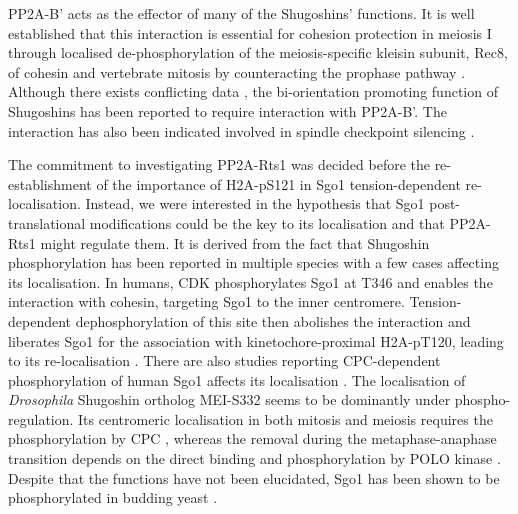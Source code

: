 PP2A-B' acts as the effector of many of the Shugoshins' functions. It is well established that this interaction is essential for cohesion protection in meiosis I through localised de-phosphorylation of the meiosis-specific kleisin subunit, Rec8, of cohesin \citep{Marston2004a, Kitajima2004a, Katis2004, Rabitsch2004TwoII, Rattani2013Sgol2Oocytes, Llano2008Shugoshin-2Mice, Lee2008} and vertebrate mitosis by counteracting the prophase pathway \citep{Shintomi2009ReleasingSgo1, Rivera2009ShugoshinExtracts, Orth2011ShugoshinMad2, Huang2007, Tang2006a, Tanno2010, McGuinness2005ShugoshinCells, Kitajima2005, Salic2004VertebrateMitosis}. Although there exists conflicting data \citep{Verzijlbergen2014, Eshleman2014}, the bi-orientation promoting function of Shugoshins has been reported to require interaction with PP2A-B'\citep{Peplowska2014, Rivera2012}. The interaction has also been indicated involved in spindle checkpoint silencing \citep{Rattani2013Sgol2Oocytes}. 

The commitment to investigating PP2A-Rts1 was decided before the re-establishment of the importance of H2A-pS121 in Sgo1 tension-dependent re-localisation. Instead, we were interested in the hypothesis that Sgo1 post-translational modifications could be the key to its localisation and that PP2A-Rts1 might regulate them. It is derived from the fact that Shugoshin phosphorylation has been reported in multiple species \citep{Llano2008Shugoshin-2Mice, Tanno2010, Rattani2013Sgol2Oocytes, Pouwels2007ShugoshinPlk1, Kawashima2007, Lee2014RegulationPhosphorylation, Liu2013, Liu2013a, Clarke2005, Resnick2006INCENPDrosophila, Nogueira2014, Yahya2020} with a few cases affecting its localisation. In humans, CDK phosphorylates Sgo1 at T346 and enables the interaction with cohesin, targeting Sgo1 to the inner centromere. Tension-dependent dephosphorylation of this site then abolishes the interaction and liberates Sgo1 for the association with kinetochore-proximal H2A-pT120, leading to its re-localisation \citep{Liu2013, Liu2013a}. There are also studies reporting CPC-dependent phosphorylation of human Sgo1 affects its localisation \citep{Pouwels2007ShugoshinPlk1, Lee2014RegulationPhosphorylation}. The localisation of \textit{Drosophila} Shugoshin ortholog MEI-S332 seems to be dominantly under phospho-regulation. Its centromeric localisation in both mitosis and meiosis requires the phosphorylation by CPC \citep{Resnick2006INCENPDrosophila, Nogueira2014}, whereas the removal during the metaphase-anaphase transition depends on the direct binding and phosphorylation by POLO kinase \citep{Clarke2005}. Despite that the functions have not been elucidated, Sgo1 has been shown to be phosphorylated in budding yeast \citep{Yahya2020, Barton2019MechanismsCerevisiae}. 

